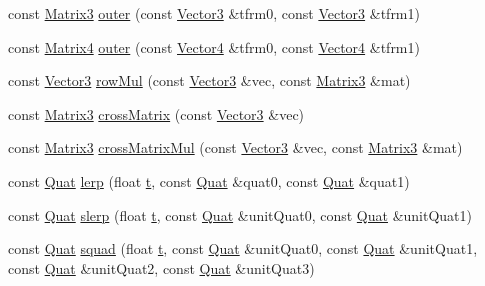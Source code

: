 \begin{DoxyCompactItemize}
const \hyperlink{classVectormath_1_1Aos_1_1Matrix3}{Matrix3} \hyperlink{namespaceVectormath_1_1Aos_a6c378593e07aaeffe549c029afb5a219}{outer} (const \hyperlink{classVectormath_1_1Aos_1_1Vector3}{Vector3} \&tfrm0, const \hyperlink{classVectormath_1_1Aos_1_1Vector3}{Vector3} \&tfrm1)
\item 
const \hyperlink{classVectormath_1_1Aos_1_1Matrix4}{Matrix4} \hyperlink{namespaceVectormath_1_1Aos_a53dd2940e5342edc4f043e12a32bfaf7}{outer} (const \hyperlink{classVectormath_1_1Aos_1_1Vector4}{Vector4} \&tfrm0, const \hyperlink{classVectormath_1_1Aos_1_1Vector4}{Vector4} \&tfrm1)
\item 
const \hyperlink{classVectormath_1_1Aos_1_1Vector3}{Vector3} \hyperlink{namespaceVectormath_1_1Aos_a0e6552699a18fef9c0859ea2423e7327}{row\-Mul} (const \hyperlink{classVectormath_1_1Aos_1_1Vector3}{Vector3} \&vec, const \hyperlink{classVectormath_1_1Aos_1_1Matrix3}{Matrix3} \&mat)
\item 
const \hyperlink{classVectormath_1_1Aos_1_1Matrix3}{Matrix3} \hyperlink{namespaceVectormath_1_1Aos_a6310eb3d440fca2c252ff14f8c18a08e}{cross\-Matrix} (const \hyperlink{classVectormath_1_1Aos_1_1Vector3}{Vector3} \&vec)
\item 
const \hyperlink{classVectormath_1_1Aos_1_1Matrix3}{Matrix3} \hyperlink{namespaceVectormath_1_1Aos_af8260180365c57864bdf280a332c9e2a}{cross\-Matrix\-Mul} (const \hyperlink{classVectormath_1_1Aos_1_1Vector3}{Vector3} \&vec, const \hyperlink{classVectormath_1_1Aos_1_1Matrix3}{Matrix3} \&mat)
\item 
const \hyperlink{classVectormath_1_1Aos_1_1Quat}{Quat} \hyperlink{namespaceVectormath_1_1Aos_a27e2a00cdc67b5389725ae07500d6067}{lerp} (float \hyperlink{Main_8cpp_a0c8806dd40fb0525e1a3a2a5f78ef88d}{t}, const \hyperlink{classVectormath_1_1Aos_1_1Quat}{Quat} \&quat0, const \hyperlink{classVectormath_1_1Aos_1_1Quat}{Quat} \&quat1)
\item 
const \hyperlink{classVectormath_1_1Aos_1_1Quat}{Quat} \hyperlink{namespaceVectormath_1_1Aos_a105986a914ab37184130f777939af95c}{slerp} (float \hyperlink{Main_8cpp_a0c8806dd40fb0525e1a3a2a5f78ef88d}{t}, const \hyperlink{classVectormath_1_1Aos_1_1Quat}{Quat} \&unit\-Quat0, const \hyperlink{classVectormath_1_1Aos_1_1Quat}{Quat} \&unit\-Quat1)
\item 
const \hyperlink{classVectormath_1_1Aos_1_1Quat}{Quat} \hyperlink{namespaceVectormath_1_1Aos_afb5791ca4ac3d8d195859adfee5899cb}{squad} (float \hyperlink{Main_8cpp_a0c8806dd40fb0525e1a3a2a5f78ef88d}{t}, const \hyperlink{classVectormath_1_1Aos_1_1Quat}{Quat} \&unit\-Quat0, const \hyperlink{classVectormath_1_1Aos_1_1Quat}{Quat} \&unit\-Quat1, const \hyperlink{classVectormath_1_1Aos_1_1Quat}{Quat} \&unit\-Quat2, const \hyperlink{classVectormath_1_1Aos_1_1Quat}{Quat} \&unit\-Quat3)

\end{DoxyCompactItemize}
